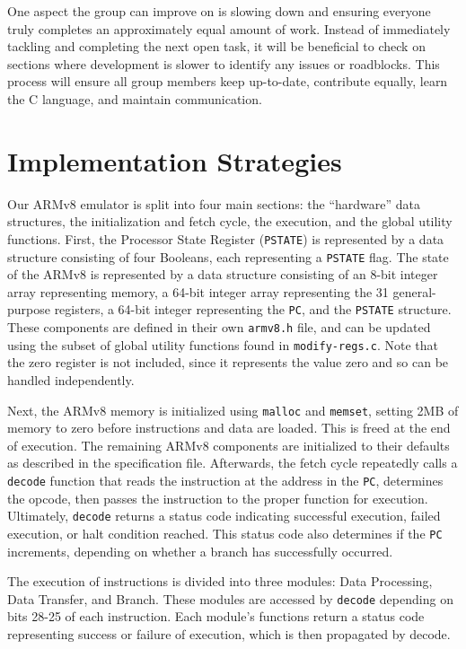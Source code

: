 \documentclass[11pt]{article}
\begin{document}
One aspect the group can improve on is slowing down and ensuring everyone truly completes an 
approximately equal amount of work. Instead of immediately tackling and completing the next 
open task, it will be beneficial to check on sections where development is slower to identify 
any issues or roadblocks. This process will ensure all group members keep up-to-date, 
contribute equally, learn the C language, and maintain communication.

\pagebreak 

\section{Implementation Strategies}

Our ARMv8 emulator is split into four main sections: the ``hardware'' data structures, the initialization 
and fetch cycle, the execution, and the global utility functions. First, the Processor State Register (\texttt{PSTATE}) 
is represented by a data structure consisting of four Booleans, each representing a \texttt{PSTATE} flag. The 
state of the ARMv8 is represented by a data structure consisting of an 8-bit integer array representing memory, 
a 64-bit integer array representing the 31 general-purpose registers, a 64-bit integer representing the \texttt{PC}, 
and the \texttt{PSTATE} structure. These components are defined in their own \texttt{armv8.h} file, 
and can be updated using the subset of global utility functions found in \texttt{modify-regs.c}. Note 
that the zero register is not included, since it represents the value zero and so can be handled independently. 

Next, the ARMv8 memory is initialized using \texttt{malloc} and \texttt{memset}, setting 2MB of memory to zero before 
instructions and data are loaded. This is freed at the end of execution. The remaining ARMv8 
components are initialized to their defaults as described in the specification file. Afterwards, 
the fetch cycle repeatedly calls a \texttt{decode} function that reads the instruction at the address 
in the \texttt{PC}, determines the opcode, then passes the instruction to the proper function for execution. 
Ultimately, \texttt{decode} returns a status code indicating successful execution, failed execution, 
or halt condition reached. This status code also determines if the \texttt{PC} increments, depending on 
whether a branch has successfully occurred. 

The execution of instructions is divided into three modules: Data Processing, Data Transfer, and 
Branch. These modules are accessed by \texttt{decode} depending on bits 28-25 of each 
instruction. Each module’s functions return a status code representing success or failure of 
execution, which is then propagated by decode.
\end{document}
